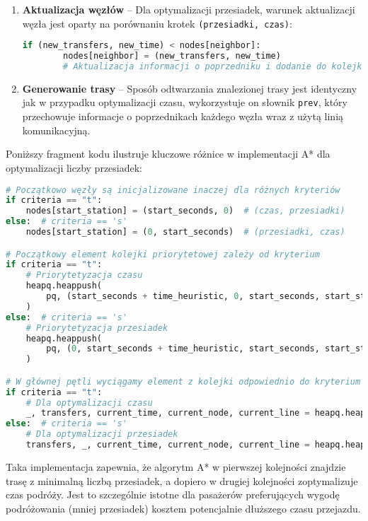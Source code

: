\documentclass[12pt,a4paper]{article}
\begin{document}
\begin{enumerate}
    \item \textbf{Aktualizacja węzłów} -- Dla optymalizacji przesiadek, warunek aktualizacji węzła jest oparty na porównaniu krotek \texttt{(przesiadki, czas)}:
    \begin{lstlisting}[language=Python]
    if (new_transfers, new_time) < nodes[neighbor]:
        nodes[neighbor] = (new_transfers, new_time)
        # Aktualizacja informacji o poprzedniku i dodanie do kolejki...
    \end{lstlisting}
    
    \item \textbf{Generowanie trasy} -- Sposób odtwarzania znalezionej trasy jest identyczny jak w przypadku optymalizacji czasu, wykorzystuje on słownik \texttt{prev}, który przechowuje informacje o poprzednikach każdego węzła wraz z użytą linią komunikacyjną.
\end{enumerate}

Poniższy fragment kodu ilustruje kluczowe różnice w implementacji A* dla optymalizacji liczby przesiadek:

\begin{lstlisting}[language=Python]
# Początkowo węzły są inicjalizowane inaczej dla różnych kryteriów
if criteria == "t":
    nodes[start_station] = (start_seconds, 0)  # (czas, przesiadki)
else:  # criteria == 's'
    nodes[start_station] = (0, start_seconds)  # (przesiadki, czas)

# Początkowy element kolejki priorytetowej zależy od kryterium
if criteria == "t":
    # Priorytetyzacja czasu
    heapq.heappush(
        pq, (start_seconds + time_heuristic, 0, start_seconds, start_station, None)
    )
else:  # criteria == 's'
    # Priorytetyzacja przesiadek
    heapq.heappush(
        pq, (0, start_seconds + time_heuristic, start_seconds, start_station, None)
    )

# W głównej pętli wyciągamy element z kolejki odpowiednio do kryterium
if criteria == "t":
    # Dla optymalizacji czasu
    _, transfers, current_time, current_node, current_line = heapq.heappop(pq)
else:  # criteria == 's'
    # Dla optymalizacji przesiadek
    transfers, _, current_time, current_node, current_line = heapq.heappop(pq)
\end{lstlisting}

Taka implementacja zapewnia, że algorytm A* w pierwszej kolejności znajdzie trasę z minimalną liczbą przesiadek, a dopiero w drugiej kolejności zoptymalizuje czas podróży. Jest to szczególnie istotne dla pasażerów preferujących wygodę podróżowania (mniej przesiadek) kosztem potencjalnie dłuższego czasu przejazdu.
\end{document}
